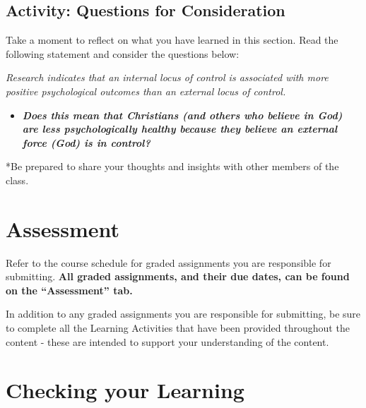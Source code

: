 \documentclass[
]{book}
\providecommand{\tightlist}{%
  \setlength{\itemsep}{0pt}\setlength{\parskip}{0pt}}
\begin{document}
\hypertarget{activity-questions-for-consideration-6}{%
\subsection*{Activity: Questions for Consideration}\label{activity-questions-for-consideration-6}}

\begin{reflect}
Take a moment to reflect on what you have learned in this section. Read the following statement and consider the questions below:

\emph{Research indicates that an internal locus of control is associated with more positive psychological outcomes than an external locus of control.}

\begin{itemize}
\tightlist
\item
  \textbf{\emph{Does this mean that Christians (and others who believe in God) are less psychologically healthy because they believe an external force (God) is in control?}}
\end{itemize}

*Be prepared to share your thoughts and insights with other members of the class.
\end{reflect}

\hypertarget{assessment-4}{%
\section*{Assessment}\label{assessment-4}}

\begin{assessment}
Refer to the course schedule for graded assignments you are responsible for submitting. \textbf{All graded assignments, and their due dates, can be found on the ``Assessment'' tab.}

In addition to any graded assignments you are responsible for submitting, be sure to complete all the Learning Activities that have been provided throughout the content - these are intended to support your understanding of the content.
\end{assessment}

\hypertarget{checking-your-learning-4}{%
\section*{Checking your Learning}\label{checking-your-learning-4}}
\end{document}
